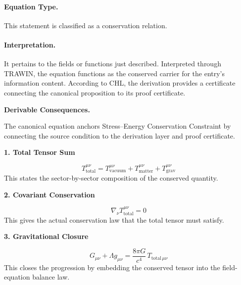 \paragraph{Equation Type.}
This statement is classified as a conservation relation.

\paragraph{Interpretation.}
It pertains to the fields or functions just described. Interpreted through TRAWIN, the equation functions as the conserved carrier for the entry’s information content. According to CHL, the derivation provides a certificate connecting the canonical proposition to its proof certificate.

\par\vspace{0.35em}
\noindent\textbf{Derivable Consequences.}\quad
\begingroup
\footnotesize
\raggedright
The canonical equation anchors Stress--Energy Conservation Constraint by connecting the source condition to the derivation layer and proof certificate.
\par\endgroup

\noindent\textbf{1. Total Tensor Sum}\par
\[
T_{\mathrm{total}}^{\mu\nu}
=
T_{\mathrm{vacuum}}^{\mu\nu}
+T_{\mathrm{matter}}^{\mu\nu}
+T_{\mathrm{grav}}^{\mu\nu}
\]
\noindent This states the sector-by-sector composition of the conserved quantity.\par
\noindent\textbf{2. Covariant Conservation}\par
\[
\nabla_{\nu}T_{\mathrm{total}}^{\mu\nu}=0
\]
\noindent This gives the actual conservation law that the total tensor must satisfy.\par
\noindent\textbf{3. Gravitational Closure}\par
\[
G_{\mu\nu}+\Lambda g_{\mu\nu}
=
\frac{8\pi G}{c^4}\,T_{\mathrm{total}\,\mu\nu}
\]
\noindent This closes the progression by embedding the conserved tensor into the field-equation balance law.\par


